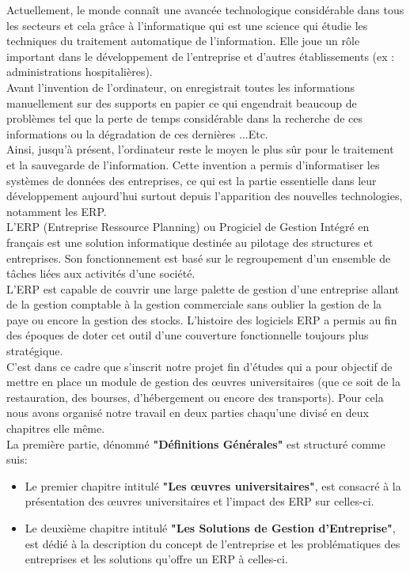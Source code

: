 Actuellement, le monde connaît une avancée technologique considérable dans tous les secteurs et cela grâce à l'informatique qui est une science qui étudie les techniques du traitement automatique de l'information. Elle joue un rôle important dans le développement de l'entreprise et d'autres établissements (ex : administrations hospitalières).\\

Avant l'invention de l'ordinateur, on enregistrait toutes les informations manuellement sur des supports en papier ce qui engendrait beaucoup de problèmes tel que la perte de temps considérable dans la recherche de ces informations ou la dégradation de ces dernières ...Etc.\\

Ainsi, jusqu'à présent, l'ordinateur reste le moyen le plus sûr pour le traitement et la sauvegarde de l'information. Cette invention a permis d'informatiser les systèmes de données des entreprises, ce qui est la partie essentielle dans leur développement aujourd'hui surtout depuis l'apparition des nouvelles technologies, notamment les \acs{ERP}.\\

L'\acs{ERP} (Entreprise Ressource Planning) ou Progiciel de Gestion Intégré en français est une solution informatique destinée au pilotage des structures et entreprises. Son fonctionnement est basé sur le regroupement d'un ensemble de tâches liées aux activités d'une société.\\

L'\acs{ERP} est capable de couvrir une large palette de gestion d'une entreprise allant de la gestion comptable à la gestion commerciale sans oublier la gestion de la paye ou encore la gestion des stocks. L'histoire des logiciels \acs{ERP} a permis au fin des époques de doter cet outil d'une couverture fonctionnelle toujours plus stratégique.\\

C'est dans ce cadre que s'inscrit notre projet fin d'études qui a pour objectif de mettre en place un module de gestion des œuvres universitaires (que ce soit de la restauration, des bourses, d'hébergement ou encore des transports). Pour cela nous avons organisé notre travail en deux parties chaqu'une divisé en deux chapitres elle même.\\

La première partie, dénommé \textbf{"Définitions Générales"} est structuré comme suis:
\begin{itemize}
    \item Le premier chapitre intitulé \textbf{"Les œuvres universitaires"}, est consacré à la présentation des œuvres universitaires et l'impact des \acs{ERP} sur celles-ci.
    \item Le deuxième chapitre intitulé \textbf{"Les Solutions de Gestion d'Entreprise"}, est dédié à la description du concept de l'entreprise et les problématiques des entreprises et les solutions qu'offre un \acs{ERP} à celles-ci.\\
\end{itemize}

